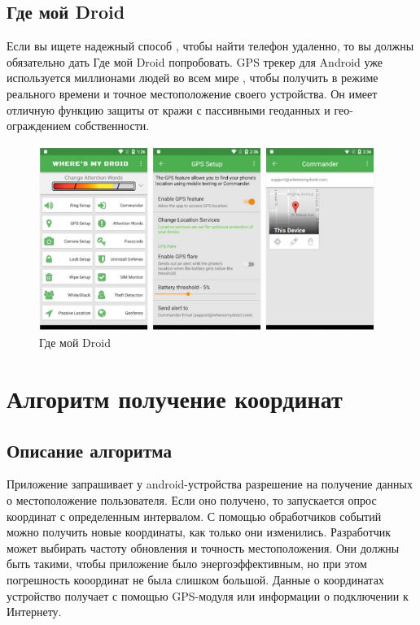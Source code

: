 \documentclass[a4paper,12pt]{article}
\begin{document}
\subsection{Где мой Droid}
Если вы ищете надежный способ , чтобы найти телефон удаленно, то вы должны обязательно дать Где мой Droid попробовать. GPS трекер для Android уже используется миллионами людей во всем мире , чтобы получить в режиме реального времени и точное местоположение своего устройства. Он имеет отличную функцию защиты от кражи с пассивными геоданных и гео-ограждением собственности.\cite{review5}
\begin{figure}
	\centering
	\includegraphics[width=10.94cm]{images/15023616093087.jpg}
	\caption{Где мой Droid}
	\label{fig:card}
\end{figure}

\pagebreak

\section{Алгоритм получение координат}
\subsection{Описание алгоритма}
Приложение запрашивает у android-устройства разрешение на получение
данных о местоположение пользователя. Если оно получено, то
запускается опрос координат с определенным интервалом. С помощью
обработчиков событий можно получить новые координаты, как только они
изменились. Разработчик может выбирать частоту обновления и точность 
местоположения. Они должны быть такими, чтобы приложение было 
энергоэффективным, но при этом погрешность кооординат не была 
слишком большой. Данные о координатах устройство получает с помощью
GPS-модуля или информации о подключении к Интернету.\cite{documentation}
\end{document}
